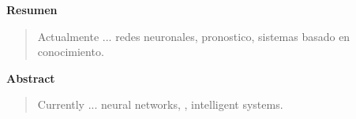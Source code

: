 
\newpage
\begin{center}
 {\bf\LARGE Resumen}
\end{center} 
\vskip 0.5cm
\begin{quotation}
Actualmente ...
\vskip 0.3cm
\hspace*{-0.6cm}{\bf Palabras claves:} redes neuronales, pronostico, sistemas basado en conocimiento.
\end{quotation}


\newpage
\begin{center}
 {\bf\LARGE Abstract}\vskip 1.5cm
\end{center} 
\begin{quotation}
Currently ...
\vskip 0.3cm
\hspace*{-0.6cm}{\bf Keywords:} neural networks, , intelligent systems.
\end{quotation}



